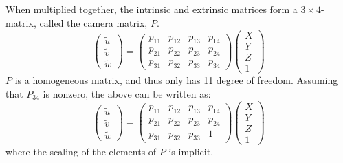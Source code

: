 When multiplied together, the intrinsic and extrinsic matrices form a $3\times4$-matrix, called the camera matrix, $P$.
\begin{equation} \label{eq:projection2}
\begin{pmatrix} \tilde{u} \\ \tilde{v} \\ \tilde{w} \end{pmatrix} =
\begin{pmatrix} p_{11} & p_{12} & p_{13} & p_{14} \\
 				p_{21} & p_{22} & p_{23} & p_{24} \\
				p_{31} & p_{32} & p_{33} & p_{34} \end{pmatrix}
\begin{pmatrix}X \\Y \\Z \\1\end{pmatrix}
\end{equation}
$P$ is a homogeneous matrix, and thus only has 11 degree of freedom.
Assuming that $P_{34}$ is nonzero, the above can be written as:
\begin{equation}\label{eq:projection3}
\begin{pmatrix} \tilde{u} \\ \tilde{v} \\ \tilde{w} \end{pmatrix} =
\begin{pmatrix} p_{11} & p_{12} & p_{13} & p_{14} \\
 				p_{21} & p_{22} & p_{23} & p_{24} \\
				p_{31} & p_{32} & p_{33} & 1 \end{pmatrix}
\begin{pmatrix}X \\Y \\Z \\1\end{pmatrix}
\end{equation}
where the scaling of the elements of $P$ is implicit. \cite[153-165]{hartley-zisserman}

